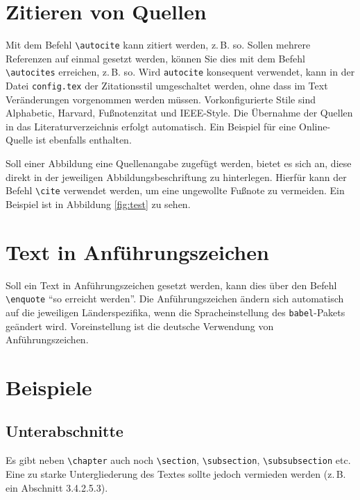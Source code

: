 \section{Zitieren von Quellen}
Mit dem Befehl \texttt{\textbackslash autocite} kann zitiert werden, z.\,B. so. \autocite[Vgl.][S. 18ff.]{ME12} Sollen mehrere Referenzen auf einmal gesetzt werden, können Sie dies mit dem Befehl \texttt{\textbackslash autocites} erreichen, z.\,B. so\autocites[Vgl.][S. 10]{ME12}[][S. 100]{TD15}. Wird \texttt{autocite} konsequent 
verwendet, kann in der Datei \texttt{config.tex} der Zitationsstil umgeschaltet werden, ohne dass im Text Veränderungen vorgenommen werden müssen. Vorkonfigurierte Stile sind Alphabetic, Harvard, Fußnotenzitat und IEEE-Style. Die Übernahme der Quellen in das Literaturverzeichnis erfolgt automatisch. Ein Beispiel für eine Online-Quelle ist ebenfalls enthalten.\autocite[Vgl.][]{TestOnlineQuelle}




Soll einer Abbildung eine Quellenangabe zugefügt werden, bietet es sich an, diese direkt in der jeweiligen Abbildungsbeschriftung zu hinterlegen. Hierfür kann der Befehl \texttt{\textbackslash cite} verwendet werden, um eine ungewollte Fußnote zu vermeiden. Ein Beispiel ist in Abbildung 
\vref{fig:test} zu sehen. 


\section{Text in Anführungszeichen}
Soll ein Text in Anführungszeichen gesetzt werden, kann dies über den Befehl \texttt{\textbackslash enquote} \enquote{so erreicht werden}. Die Anführungszeichen ändern sich automatisch auf die 
jeweiligen Länderspezifika, wenn die Spracheinstellung des \texttt{babel}-Pakets geändert wird. Voreinstellung ist die deutsche Verwendung von 
Anführungszeichen.




\section{Beispiele}
\lipsum[1]

\subsection{Unterabschnitte}
Es gibt neben \texttt{\textbackslash chapter} auch noch  \texttt{\textbackslash section}, \texttt{\textbackslash subsection}, \texttt{\textbackslash subsubsection} etc. Eine zu starke Untergliederung des Textes sollte jedoch vermieden werden (z.\,B. ein Abschnitt 3.4.2.5.3). 

